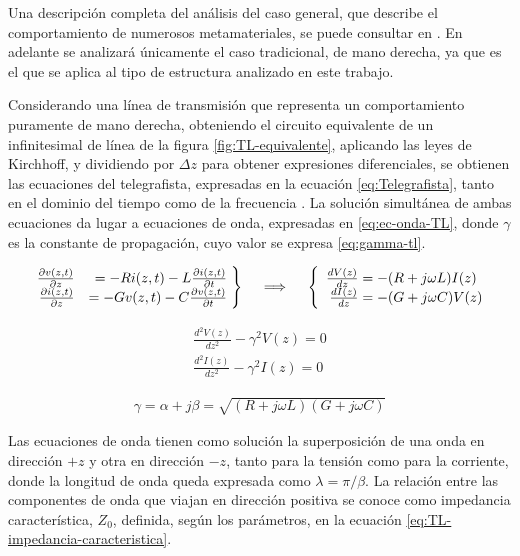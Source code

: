 Una descripción completa del análisis del caso general, que describe el comportamiento de numerosos metamateriales, se puede consultar en \cite{Caloz}. En adelante se analizará únicamente el caso tradicional, de mano derecha, ya que es el que se aplica al tipo de estructura analizado en este trabajo.

Considerando una línea de transmisión que representa un comportamiento puramente de mano derecha, obteniendo el circuito equivalente de un infinitesimal de línea de la figura \ref{fig:TL-equivalente}, aplicando las leyes de Kirchhoff, y dividiendo por $\Delta z$ para obtener expresiones diferenciales, se obtienen las ecuaciones del telegrafista, expresadas en la ecuación \ref{eq:Telegrafista}, tanto en el dominio del tiempo como de la frecuencia \cite{Fernandez:Electromag}. La solución simultánea de ambas ecuaciones da lugar a ecuaciones de onda, expresadas en \ref{eq:ec-onda-TL}, donde $\gamma$ es la constante de propagación, cuyo valor se expresa \ref{eq:gamma-tl}.

\begin{align}
	\label{eq:Telegrafista}
	\left. \begin{array}{rr@{\mskip\thickmuskip}l}
	\frac{\partial v(z,t)}{\partial z} & = -R i(z,t) - L \frac{\partial i(z,t)}{\partial t}\\
	\frac{\partial i(z,t)}{\partial z} & = -G v(z,t) - C \frac{\partial v(z,t)}{\partial t}
	\end{array}\right\} \quad \implies \quad \left\{\begin{array}{r@{\mskip\thickmuskip}l}
	\frac{dV(z)}{dz} & = -(R+j\omega L)I(z) \\
	\frac{dI(z)}{dz} & = -(G+j\omega C)V(z) 
	\end{array}\right.
\end{align}


\begin{equation}
\begin{aligned}
	\frac{d^2 V(z)}{dz^2} - \gamma^2 V(z) = 0 \\
	\frac{d^2 I(z)}{dz^2} - \gamma^2 I(z) = 0
\end{aligned}
\label{eq:ec-onda-TL}
\end{equation}

\begin{align}
	\label{eq:gamma-tl}
	\gamma = \alpha + j\beta = \sqrt{(R+j\omega L)(G+j\omega C)}	
\end{align}

 Las ecuaciones de onda tienen como solución la superposición de una onda en dirección $+z$ y otra en dirección $-z$, tanto para la tensión como para la corriente, donde la longitud de onda queda expresada como $\lambda = \pi/\beta$. La relación entre las componentes de onda que viajan en dirección positiva se conoce como impedancia característica, $Z_0$, definida, según los parámetros, en la ecuación \ref{eq:TL-impedancia-caracteristica}.
 
